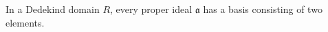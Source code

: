 In a Dedekind domain $R$, every proper ideal $\mathfrak{a}$ has a basis consisting of two elements.
